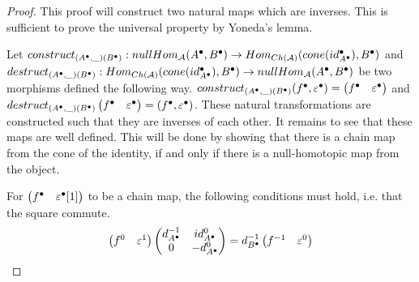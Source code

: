     \begin{proof}
        This proof will construct two natural maps which are inverses. This is sufficient to prove the universal property by Yoneda's lemma.

        Let $construct_{(A^{\bullet},\_)(B^{\bullet})}:nullHom_{\mathcal{A}}(A^{\bullet},B^{\bullet})\rightarrow Hom_{Ch(\mathcal{A})}(cone(id_{A^{\bullet}}^{\bullet}),B^{\bullet})$ and \\$destruct_{(A^{\bullet},\_)(B^{\bullet})}:Hom_{Ch(\mathcal{A})}(cone(id_{A^{\bullet}}^{\bullet}),B^{\bullet})\rightarrow nullHom_{\mathcal{A}}(A^{\bullet},B^{\bullet})$ be two morphisms defined the following way.
        $construct_{(A^{\bullet},\_)(B^{\bullet})}(f^{\bullet},\varepsilon^{\bullet})=\begin{pmatrix}f^{\bullet} & \varepsilon^{\bullet}\end{pmatrix}$ and \\$destruct_{(A^{\bullet},\_)(B^{\bullet})}\begin{pmatrix}f^{\bullet} & \varepsilon^{\bullet}\end{pmatrix} = (f^{\bullet}, \varepsilon^{\bullet})$. These natural transformations are constructed such that they are inverses of each other. It remains to see that these maps are well defined. This will be done by showing that there is a chain map from the cone of the identity, if and only if there is a null-homotopic map from the object.

        \begin{center}
        \end{center}

        For $\begin{pmatrix}f^{\bullet} & \varepsilon^{\bullet}[1]\end{pmatrix}$ to be a chain map, the following conditions must hold, i.e. that the square commute.
        \begin{equation*}
            \begin{pmatrix}f^0 & \varepsilon^1 \end{pmatrix}\begin{pmatrix}d^{-1}_{A^{\bullet}} & id^0_{A^{\bullet}} \\ 0 & -d^0_{A^{\bullet}}\end{pmatrix}=d^{-1}_{B^{\bullet}}\begin{pmatrix} f^{-1} & \varepsilon^0 \end{pmatrix}
        \end{equation*}


\end{proof}
